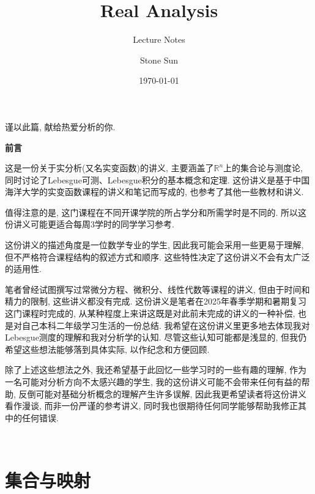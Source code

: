 \documentclass[theorem=false,mathfont=none,openany,sub3section]{easybook}
\title{Real Analysis}
\subtitle{Lecture Notes}
\author{Stone Sun}
\date{\today}
\renewcommand{\rmdefault}{lmr}
\newcommand{\btocgroup}[1][toc]{\addtocontents{#1}{\string\begingroup}}
\newcommand{\etocgroup}[1][toc]{\addtocontents{#1}{\string\endgroup}}
\begin{document}
\maketitle
\begin{center}
谨以此篇, 献给热爱分析的你.\par
\end{center}
\frontmatter

\begingroup
\renewcommand{\familydefault}{\rmdefault}
\tableofcontents
\endgroup

\newpage
\begin{center}
\Large
\textbf{前言}\par
\end{center}

\hspace{2em}
这是一份关于实分析(又名实变函数)的讲义, 主要涵盖了$\mathbb{R}^n$上的集合论与测度论, 同时讨论了Lebesgue可测、Lebesgue积分的基本概念和定理. 这份讲义是基于中国海洋大学的实变函数课程的讲义和笔记而写成的, 也参考了其他一些教材和讲义.\par
值得注意的是, 这门课程在不同开课学院的所占学分和所需学时是不同的. 所以这份讲义可能更适合每周3学时的同学学习参考.\par
这份讲义的描述角度是一位数学专业的学生, 因此我可能会采用一些更易于理解, 但不严格符合课程结构的叙述方式和顺序. 这些特性决定了这份讲义不会有太广泛的适用性.\par
笔者曾经试图撰写过常微分方程、微积分、线性代数等课程的讲义, 但由于时间和精力的限制, 这些讲义都没有完成. 这份讲义是笔者在2025年春季学期和暑期复习这门课程时完成的, 从某种程度上来讲这既是对此前未完成的讲义的一种补偿, 也是对自己本科二年级学习生活的一份总结. 我希望在这份讲义里更多地去体现我对Lebesgue测度的理解和我对分析学的认知. 尽管这些认知可能都是浅显的, 但我仍希望这些想法能够落到具体实际, 以作纪念和方便回顾.\par
除了上述这些想法之外, 我还希望基于此回忆一些学习时的一些有趣的理解, 作为一名可能对分析方向不太感兴趣的学生, 我的这份讲义可能不会带来任何有益的帮助, 反倒可能对基础分析概念的理解产生许多误解, 因此我更希望读者将这份讲义看作漫谈, 而非一份严谨的参考讲义, 同时我也很期待任何同学能够帮助我修正其中的任何错误.\par
\begin{flushright}
\\
\text{\today}
\end{flushright}

\mainmatter

\btocgroup
{}
\chapter{集合与映射}
\etocgroup
\end{document}
